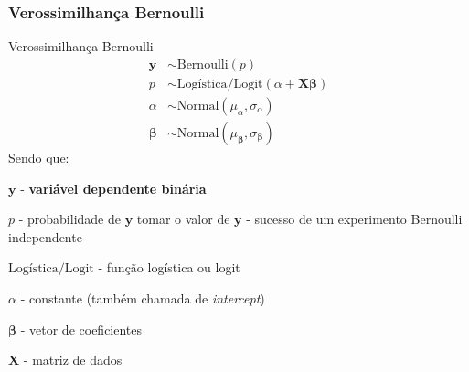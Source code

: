 \subsubsection{Verossimilhança Bernoulli}
\begin{frame}{Verossimilhança Bernoulli}
	\small
	$$
		\begin{aligned}
			\boldsymbol{y}     & \sim \text{Bernoulli}\left( p\right)                                      \\
			p                  & \sim \text{Logística/Logit}(\alpha +  \mathbf{X} \boldsymbol{\beta})      \\
			\alpha             & \sim \text{Normal}(\mu_\alpha, \sigma_\alpha)                             \\
			\boldsymbol{\beta} & \sim \text{Normal}(\mu_{\boldsymbol{\beta}}, \sigma_{\boldsymbol{\beta}})
		\end{aligned}
	$$
	Sendo que:
	\begin{vfilleditems}
		\item \small $\boldsymbol{y}$ - \textbf{variável dependente binária}
		\item \small $p$ - probabilidade de $\boldsymbol{y}$ tomar o valor de $\boldsymbol{y}$ - sucesso de um experimento Bernoulli independente
		\item \small $\text{Logística/Logit}$ - função logística ou logit
		\item \small $\alpha$ - constante (também chamada de \textit{intercept})
		\item \small $\boldsymbol{\beta}$ - vetor de coeficientes
		\item \small $\mathbf{X}$ - matriz de dados
	\end{vfilleditems}
\end{frame}

